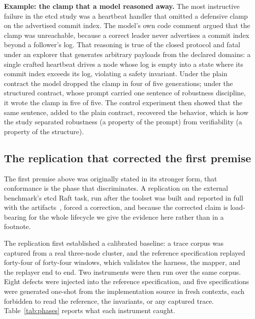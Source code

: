\documentclass[11pt]{article}
\newenvironment{example}[1][Example]%
  {\par\smallskip\begin{leftbar}\noindent\textbf{#1.}\enspace}%
  {\end{leftbar}\par\smallskip}
\begin{document}
\begin{example}[Example: the clamp that a model reasoned away]
The most instructive failure in the etcd study was a heartbeat handler that
omitted a defensive clamp on the advertised commit index. The model's own code
comment argued that the clamp was unreachable, because a correct leader never
advertises a commit index beyond a follower's log. That reasoning is true of the
closed protocol and fatal under an explorer that generates arbitrary payloads
from the declared domains: a single crafted heartbeat drives a node whose log is
empty into a state where its commit index exceeds its log, violating a safety
invariant. Under the plain contract the model dropped the clamp in four of five
generations; under the structured contract, whose prompt carried one sentence of
robustness discipline, it wrote the clamp in five of five. The control experiment
then showed that the same sentence, added to the plain contract, recovered the
behavior, which is how the study separated robustness (a property of the prompt)
from verifiability (a property of the structure).
\end{example}

\subsection{The replication that corrected the first premise}\label{sub:replication}

The first premise above was originally stated in its stronger form, that
conformance is the phase that discriminates. A replication on the external
benchmark's etcd Raft task, run after the toolset was built and reported in full
with the artifacts~\cite{repo}, forced a correction, and because the corrected
claim is load-bearing for the whole lifecycle we give the evidence here rather
than in a footnote.

The replication first established a calibrated baseline: a trace corpus was
captured from a real three-node cluster, and the reference specification replayed
forty-four of forty-four windows, which validates the harness, the mapper, and
the replayer end to end. Two instruments were then run over the same corpus. Eight
defects were injected into the reference specification, and five specifications
were generated one-shot from the implementation source in fresh contexts, each
forbidden to read the reference, the invariants, or any captured trace.
Table~\ref{tab:phases} reports what each instrument caught.
\end{document}
